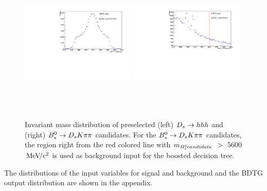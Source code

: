\begin{figure}[h]
\includegraphics[height=7.0cm,width=0.49\textwidth]{figs/Ds_MM_afterpresel.pdf}
\includegraphics[height=7.0cm,width=0.49\textwidth]{figs/Bs_MM_afterpresel.pdf}
\caption{Invariant mass distribution of preselected (left) ${{D}_{s}}\rightarrow{\ensuremath{h}}{\ensuremath{h}}{\ensuremath{h}}$ and (right) ${{B}^0_{s}}\rightarrow{\ensuremath{{D}_{s}}}{\ensuremath{K}}{\ensuremath{\pi}}{\ensuremath{\pi}}$ candidates. 
For the  ${{B}^0_{s}}\rightarrow{\ensuremath{{D}_{s}}}{\ensuremath{K}}{\ensuremath{\pi}}{\ensuremath{\pi}}$ candidates, the region right from the red colored line with $m_{{{B}^0_{s}} candidate}$ $>$ 5600 ${\mathrm{\,Me\kern -0.1em V\!/}c^2}$ is used as background input for the boosted decision tree.}
\label{fig:massforBDT}
\end{figure}

The distributions of the input variables for signal and background and 
the BDTG output distribution are shown in the appendix.

